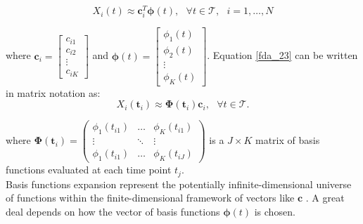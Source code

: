 \begin{equation}\label{fda_23}
   X_{i}(t) \approx \mathbf{c}^{T}_{i}\boldsymbol\phi(t),\text{ }\forall t \in \mathcal{T},\text{ } i = 1,\dots,N
\end{equation}

where $\mathbf{c}_{i} = \begin{bmatrix}
c_{i1}\\
c_{i2}\\
\vdots\\
c_{iK}
\end{bmatrix}$ and $\bm{\phi}(t) = \begin{bmatrix}
\phi_{1}(t)\\
\phi_{2}(t)\\
\vdots\\
\phi_{K}(t)
\end{bmatrix}$. Equation \eqref{fda_23} can be written in matrix notation as:
\begin{equation}\label{fda_24}
   X_i(\bm{t}_i) \approx \bm{\Phi}(\bm{t}_i) \mathbf{c}_i,\text{ }\forall t \in \mathcal{T}.
\end{equation}

where $\mathbf{\Phi}(\bm{t}_i)=\begin{pmatrix}
\phi_{1}(t_{i1}) & \dots & \phi_{K}(t_{i1})\\
\vdots & \ddots & \vdots\\
\phi_{1}(t_{i1}) & \dots & \phi_{K}(t_{iJ})
\end{pmatrix}$ is a $J \times K$ matrix of basis functions evaluated at each time point $t_j$.\\
Basis functions expansion represent the potentially infinite-dimensional universe of functions within the finite-dimensional framework of vectors like $\mathbf{c}$ \citep{olberd:ramsay}. A great deal depends on how the vector of basis functions $\bm{\phi}(t)$ is chosen.
\clearpage

